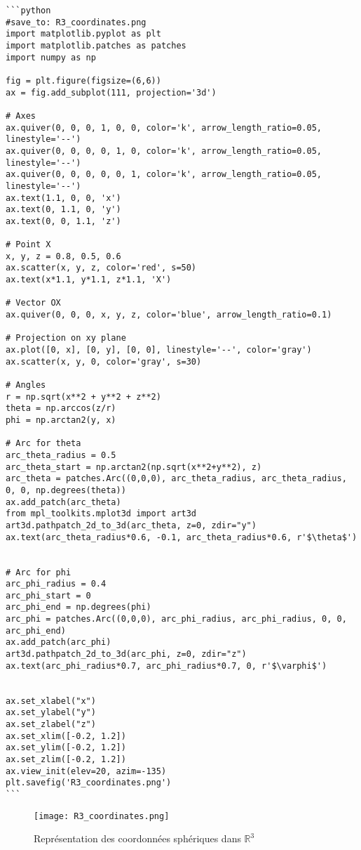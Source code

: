 \begin{verbatim}
```python
#save_to: R3_coordinates.png
import matplotlib.pyplot as plt
import matplotlib.patches as patches
import numpy as np

fig = plt.figure(figsize=(6,6))
ax = fig.add_subplot(111, projection='3d')

# Axes
ax.quiver(0, 0, 0, 1, 0, 0, color='k', arrow_length_ratio=0.05, linestyle='--')
ax.quiver(0, 0, 0, 0, 1, 0, color='k', arrow_length_ratio=0.05, linestyle='--')
ax.quiver(0, 0, 0, 0, 0, 1, color='k', arrow_length_ratio=0.05, linestyle='--')
ax.text(1.1, 0, 0, 'x')
ax.text(0, 1.1, 0, 'y')
ax.text(0, 0, 1.1, 'z')

# Point X
x, y, z = 0.8, 0.5, 0.6
ax.scatter(x, y, z, color='red', s=50)
ax.text(x*1.1, y*1.1, z*1.1, 'X')

# Vector OX
ax.quiver(0, 0, 0, x, y, z, color='blue', arrow_length_ratio=0.1)

# Projection on xy plane
ax.plot([0, x], [0, y], [0, 0], linestyle='--', color='gray')
ax.scatter(x, y, 0, color='gray', s=30)

# Angles
r = np.sqrt(x**2 + y**2 + z**2)
theta = np.arccos(z/r)
phi = np.arctan2(y, x)

# Arc for theta
arc_theta_radius = 0.5
arc_theta_start = np.arctan2(np.sqrt(x**2+y**2), z)
arc_theta = patches.Arc((0,0,0), arc_theta_radius, arc_theta_radius, 0, 0, np.degrees(theta))
ax.add_patch(arc_theta)
from mpl_toolkits.mplot3d import art3d
art3d.pathpatch_2d_to_3d(arc_theta, z=0, zdir="y")
ax.text(arc_theta_radius*0.6, -0.1, arc_theta_radius*0.6, r'$\theta$')


# Arc for phi
arc_phi_radius = 0.4
arc_phi_start = 0
arc_phi_end = np.degrees(phi)
arc_phi = patches.Arc((0,0,0), arc_phi_radius, arc_phi_radius, 0, 0, arc_phi_end)
ax.add_patch(arc_phi)
art3d.pathpatch_2d_to_3d(arc_phi, z=0, zdir="z")
ax.text(arc_phi_radius*0.7, arc_phi_radius*0.7, 0, r'$\varphi$')


ax.set_xlabel("x")
ax.set_ylabel("y")
ax.set_zlabel("z")
ax.set_xlim([-0.2, 1.2])
ax.set_ylim([-0.2, 1.2])
ax.set_zlim([-0.2, 1.2])
ax.view_init(elev=20, azim=-135)
plt.savefig('R3_coordinates.png')
```
\end{verbatim}

\begin{figure}[h]
    \centering
    \texttt{[image: R3\_coordinates.png]}
    \caption{Représentation des coordonnées sphériques dans $\mathbb{R}^3$}
    \label{fig:R3_coordinates}
\end{figure}


